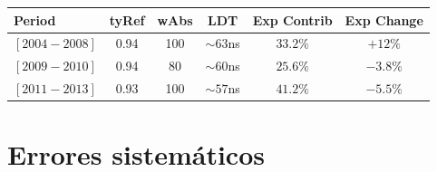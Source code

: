 	\begin{table}[h!]
	\centering
	 \begin{tabular}{l|ccc|c|c}
				Period       & tyRef & wAbs & LDT        & Exp Contrib  &   Exp Change \\
				\hline
				$[2004 - 2008]$ & 0.94  & 100  & $\sim63$ns & $33.2\%$     &   $+12\%$ \\
				$[2009 - 2010]$ & 0.94  & 80   & $\sim60$ns & $25.6\%$     &   $-3.8\%$\\
				$[2011 - 2013]$ & 0.93  & 100  & $\sim57$ns & $41.2\%$     &   $-5.5\%$\\
			\end{tabular}
	\end{table}
	
	
\section{Errores sistem\'aticos}
			
